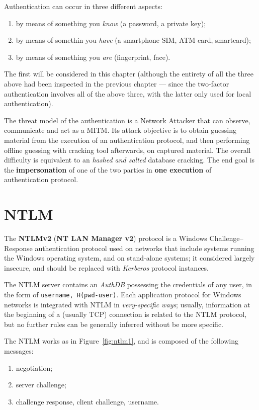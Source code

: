 \documentclass[10pt]{extreport}
\begin{document}
Authentication can occur in three different aspects:
\begin{enumerate}
    \item by means of something you \emph{know} (a password, a private key);
    \item by means of somethin you \emph{have} (a smartphone SIM, ATM card,
        smartcard);
    \item by means of something you \emph{are} (fingerprint, face).
\end{enumerate}

The first will be considered in this chapter (although the entirety of all the
three above had been inspected in the previous chapter --- since the
two\--factor authentication involves all of the above three, with the latter
only used for local authentication).

The threat model of the authentication is a Network Attacker that can observe,
communicate and act as a MITM. Its attack objective is to obtain guessing
material from the execution of an authentication protocol, and then performing
offline guessing with cracking tool afterwards, on captured material. The
overall difficulty is equivalent to an \emph{hashed and salted} database
cracking. The end goal is the \textbf{impersonation} of one of the two parties
in \textbf{one execution} of authentication protocol.

\section{NTLM}

The \textbf{NTLMv2} (\textbf{NT LAN Manager v2}) protocol is a Windows
Challenge\---Response authentication protocol used on networks that include
systems running the Windows operating system, and on stand\--alone systems; it
considered largely insecure, and should be replaced with \emph{Kerberos}
protocol instances.

The NTLM server contains an \emph{AuthDB} possessing the credentials of any
user, in the form of \texttt{username, H(pwd-user)}. Each application protocol
for Windows networks is integrated with NTLM in \emph{very\--specific ways};
usually, information at the beginning of a (usually TCP) connection is related
to the NTLM protocol, but no further rules can be generally inferred without be
more specific.

The NTLM works as in Figure~\ref{fig:ntlm1}, and is composed of the following
messages:
\begin{enumerate}
    \item negotiation;
    \item server challenge;
    \item challenge response, client challenge, username.
\end{enumerate}
\end{document}

